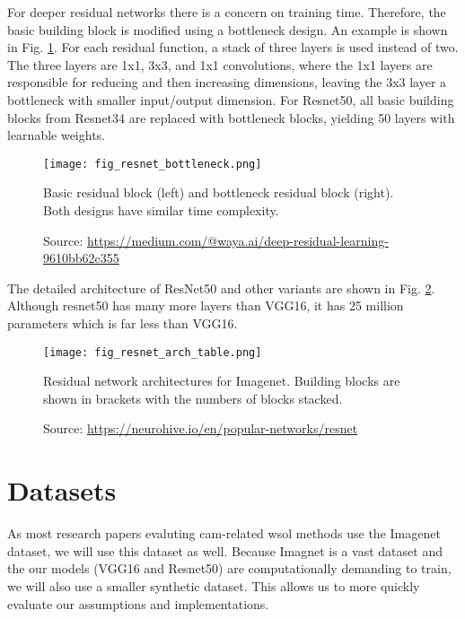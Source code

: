 For deeper residual networks there is a concern on training time. Therefore, the basic building block is modified using a bottleneck design. An example is shown in Fig. \ref{fig:resnet_bottleneck}. For each residual function, a stack of three layers is used instead of two. The three layers are 1x1, 3x3, and 1x1 convolutions, where the 1x1 layers
are responsible for reducing and then increasing dimensions, leaving the 3x3 layer a bottleneck with smaller input/output dimension. For Resnet50, all basic building blocks from Resnet34 are replaced with bottleneck blocks, yielding 50 layers with learnable weights.
\begin{figure}[ht]
    \begin{center}       
    \texttt{[image: fig\_resnet\_bottleneck.png]}
    \caption[Residual basic and bottleneck blocks]{Basic residual block (left) and bottleneck residual block (right). Both designs have similar time complexity.}
    \caption*{Source: \href{https://medium.com/@waya.ai/deep-residual-learning-9610bb62c355}{https://medium.com/@waya.ai/deep-residual-learning-9610bb62c355}}
    \label{fig:resnet_bottleneck}
    \end{center}
\end{figure}

The detailed architecture of ResNet50 and other variants are shown in Fig. \ref{fig:resnet_arch_table}. Although resnet50 has many more layers than VGG16, it has 25 million parameters which is far less than VGG16. 
\begin{figure}[ht]
    \begin{center}       
    \texttt{[image: fig\_resnet\_arch\_table.png]}
    \caption[Residual network architectures]{Residual network architectures for Imagenet. Building blocks are shown in brackets with the numbers of blocks stacked.}
    \caption*{Source: \href{https://neurohive.io/en/popular-networks/resnet}{https://neurohive.io/en/popular-networks/resnet}}
    \label{fig:resnet_arch_table}
    \end{center}
\end{figure}

\section{Datasets}
As most research papers evaluting \acrshort{cam}-related \acrshort{wsol} methods use the Imagenet dataset, we will use this dataset as well. Because Imagnet is a vast dataset and the our models (VGG16 and Resnet50) are computationally demanding to train, we will also use a smaller synthetic dataset. This allows us to more quickly evaluate our assumptions and implementations.

